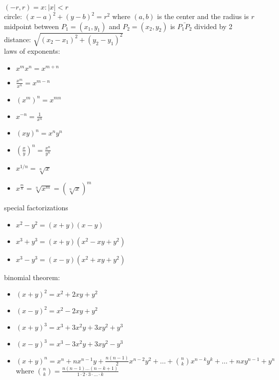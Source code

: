 \documentclass{article}
\begin{document}
$(-r, r) = {x : \lvert x\rvert < r}$\\

circle: $(x-a)^2 + (y-b)^2 = r^2$ where $(a, b)$ is the center and the radius is $r$\\

midpoint between $P_1 = (x_1, y_1)$ and $P_2 = (x_2, y_2)$ is $\bar{P_{1}P_2}$ divided by 2\\

distance: $\sqrt{(x_2 - x_1)^2 + (y_2 - y_1)^2}$\\

laws of exponents: 

	\begin{itemize}
		\item $x^mx^n = x^{m+n}$
		\item $\frac{x^m}{x^n} = x^{m-n}$
		\item $(x^m)^n = x^{mn}$
		\item $x^{-n} = \frac{1}{x^n}$
		\item $(xy)^n = x^ny^n$
		\item $(\frac{x}{y})^n = \frac{x^n}{y^n}$
		\item $x^{1/n} = \sqrt[n]{x}$
		\item $x^{\frac{m}{n}} = \sqrt[n]{x^m} = (\sqrt[n]{x})^m$
	\end{itemize}

special factorizations

	\begin{itemize}
		\item $x^2 - y^2 = (x + y)(x - y)$
		\item $x^3 + y^3 = (x + y)(x^2 - xy + y^2)$
		\item $x^3 - y^3 = (x - y)(x^2 + xy + y^2)$
	\end{itemize}

binomial theorem:

	\begin{itemize}
		\item $(x + y)^2 = x^2 + 2xy + y^2$
		\item $(x - y)^2 = x^2 - 2xy + y^2$
		\item $(x + y)^3 = x^3 + 3x^2y + 3xy^2 + y^3$
		\item $(x - y)^3 = x^3 - 3x^2y + 3xy^2 - y^3$
		\item $(x + y)^n = x^n + nx^{n-1}y + \frac{n(n-1)}{2}x^{n-2}y^2 + \ldots + \binom{n}{k}x^{n-k}y^k + \dots + nxy^{n-1} + y^n$
			where $\binom{n}{k} = \frac{n(n-1) \dots (n-k+1)}{1 \cdot 2 \cdot 3 \cdot \ldots \cdot k}$
	\end{itemize}
\end{document}
